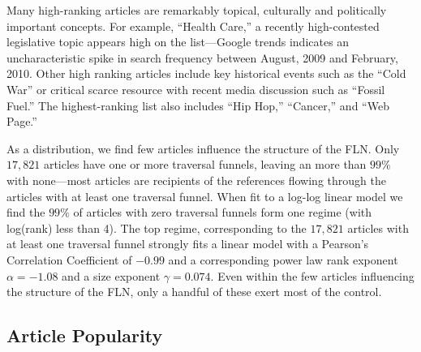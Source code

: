 \documentclass[11pt]{report}
\begin{document}
Many high-ranking articles are remarkably topical, culturally and politically important concepts.  For example, ``Health Care,'' a recently high-contested legislative topic appears high on the list---Google trends indicates an uncharacteristic spike in search frequency between August, 2009 and February, 2010.
Other high ranking articles include key historical events such as the ``Cold War'' or critical scarce resource with recent 
media discussion such as ``Fossil Fuel.'' 
The highest-ranking list also includes ``Hip Hop,'' ``Cancer,'' and ``Web Page.''

As a distribution, we find few articles influence the structure of the 
FLN. Only $17, 821$ articles have one or more traversal funnels, leaving
an more than $99\%$ with none---most articles are recipients of 
the references flowing through the articles with at least one traversal funnel.
When fit to a log-log linear model we find the $99\%$ of articles with zero
traversal funnels form one regime (with log(rank) less than 4).
The top regime, corresponding to the $17, 821$ articles with at least one 
traversal funnel strongly fits a linear model with
a Pearson's Correlation Coefficient of $-0.99$ and a 
corresponding power law rank exponent $\alpha = -1.08$
and a size exponent $\gamma = 0.074$. Even within the few articles
influencing the structure of the FLN, only a handful of these exert most of the 
control. 

\subsection{Article Popularity}
\end{document}
